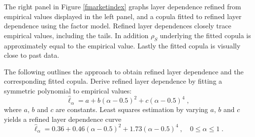 \documentclass[authoryear]{elsarticle}
\newcommand{\cq}{\ ,\quad }
\newcommand{\fref}[1]{Figure \ref{#1}}
\begin{document}
The right panel in \fref{fmarketindex} graphs layer dependence refined from empirical values displayed in the left panel, and a copula fitted to refined layer dependence using the factor model. Refined layer dependences closely trace empirical values, including the tails. In addition  $\rho_S$ underlying the fitted copula is approximately equal to the empirical value. Lastly the fitted copula is visually close to past data.

The following outlines the approach to obtain refined layer dependence and the corresponding fitted copula. Derive refined layer dependence by fitting a symmetric polynomial to empirical values:
$$
\hat{\ell}_\alpha = a+b(\alpha-0.5)^2+c(\alpha-0.5)^4   \;,
$$
where $a$, $b$ and $c$ are constants. Least squares estimation by varying $a$, $b$ and $c$ yields a refined layer dependence curve
$$
\hat{\ell}_\alpha = 0.36+0.46(\alpha-0.5)^2+1.73(\alpha-0.5)^4 \cq 0\leq\alpha\leq1 \;.
$$
\end{document}
